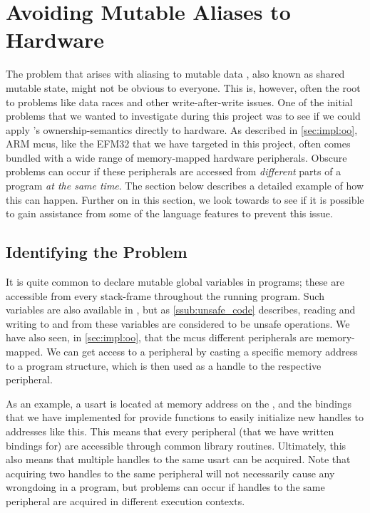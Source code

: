 
\section{Avoiding Mutable Aliases to Hardware}
\label{sec:avoiding_mutable_aliases_to_hardware}

The problem that arises with aliasing to mutable data \cite{web:problem_with_shared_mutability}, also known as shared mutable state, might not be obvious to everyone.
This is, however, often the root to problems like data races and other write-after-write issues.
One of the initial problems that we wanted to investigate during this project was to see if we could apply {\rust}'s ownership-semantics directly to hardware.
As described in \autoref{sec:impl:oo}, ARM \glspl{mcu}, like the EFM32 that we have targeted in this project, often comes bundled with a wide range of memory-mapped hardware peripherals.
Obscure problems can occur if these peripherals are accessed from \emph{different} parts of a program \emph{at the same time}.
The section below describes a detailed example of how this can happen.
Further on in this section, we look towards {\rust} to see if it is possible to gain assistance from some of the language features to prevent this issue.

\subsection{Identifying the Problem}

It is quite common to declare mutable global variables in {\C} programs; these are accessible from every stack-frame throughout the running program.
Such variables are also available in {\rust}, but as \autoref{ssub:unsafe_code} describes, reading and writing to and from these variables are considered to be unsafe operations.
We have also seen, in \autoref{sec:impl:oo}, that the \glspl{mcu} different peripherals are memory-mapped.
We can get access to a peripheral by casting a specific memory address to a program structure, which is then used as a handle to the respective peripheral.

As an example, a \gls{usart} is located at memory address  on the {\gecko}, and the bindings that we have implemented for {\emlib} provide functions to easily initialize new handles to addresses like this.
This means that every peripheral (that we have written bindings for) are accessible through common library routines.
Ultimately, this also means that multiple handles to the same \gls{usart} can be acquired.
Note that acquiring two handles to the same peripheral will not necessarily cause any wrongdoing in a program, but problems can occur if handles to the same peripheral are acquired in different execution contexts.

